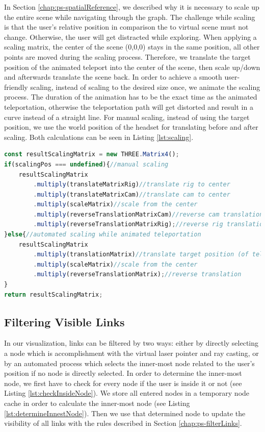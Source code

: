 In Section \ref{chap:ps-spatialReference}, we described why it is necessary to scale up the entire scene while navigating through the graph. 
The challenge while scaling is that the user's relative position in comparison the to virtual scene must not change. Otherwise, the user will get distracted while exploring.
When applying a scaling matrix, the center of the scene (0,0,0) stays in the same position, all other points are moved during the scaling process. 
Therefore, we translate the target position of the animated teleport into the center of the scene, then scale up/down and afterwards translate the scene back.
In order to achieve a smooth user-friendly scaling, instead of scaling to the desired size once, we animate the scaling process. The duration of the animation has to be the exact time as the animated teleportation, otherwise the teleportation path will get distorted and result in a curve instead of a straight line.
For manual scaling, instead of using the target position, we use the world position of the headset for translating before and after scaling. Both calculations can be seen in Listing \ref{lst:scaling}.
\pagebreak

\begin{lstlisting}[language=JavaScript,label={lst:scaling},caption=Simplified algorithm for calculating the scaling matrix]
const resultScalingMatrix = new THREE.Matrix4();
if(scalingPos === undefined){//manual scaling
    resultScalingMatrix
        .multiply(translateMatrixRig)//translate rig to center
        .multiply(translateMatrixCam)//translate cam to center
        .multiply(scaleMatrix)//scale from the center
        .multiply(reverseTranslationMatrixCam)//reverse cam translation
        .multiply(reverseTranslationMatrixRig);//reverse rig translation
}else{//automated scaling while animated teleportation
    resultScalingMatrix
        .multiply(translationMatrix)//translate target position (of teleport) to center
        .multiply(scaleMatrix)//scale from the center
        .multiply(reverseTranslationMatrix);//reverse translation
}
return resultScalingMatrix;
\end{lstlisting}

\subsection{Filtering Visible Links}
\label{sec:linkFiltering}

In our visualization, links can be filtered by two ways: either by directly selecting a node which is accomplishment with the virtual laser pointer and ray casting, or by an automated process which selects the inner-most node related to the user's position if no node is directly selected.
In order to determine the inner-most node, we first have to check for every node if the user is inside it or not (see Listing \ref{lst:checkInsideNode}). We store all entered nodes in a temporary node cache in order to calculate the inner-most node (see Listing \ref{lst:determineInnestNode}).
Then we use that determined node to update the visibility of all links with the rules described in Section \ref{chap:ps-filterLinks}.

